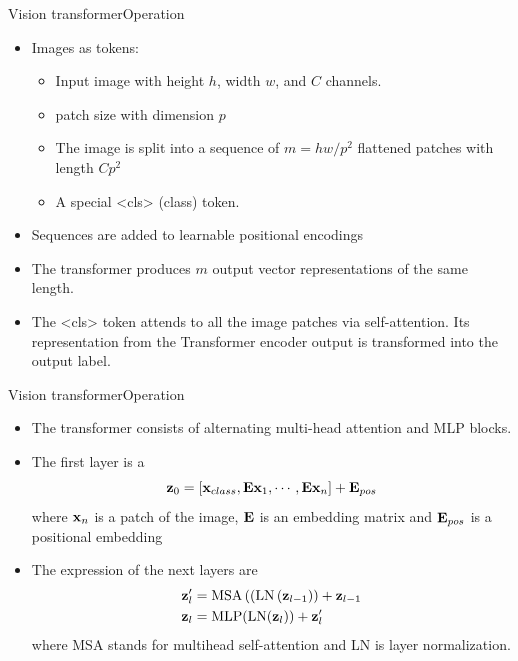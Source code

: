 \documentclass{beamer}
\begin{document}
\begin{frame}{Vision transformer}{Operation}

\begin{itemize}
\item Images as tokens:
\begin{itemize}
\item Input image with height $h$, width $w$, and $C$
 channels. 
 \item patch size with dimension $p$
\item The image is split into a sequence of $m=hw/p^2$
 flattened patches with length $Cp^2$
 \item  A special <cls> (class) token.
\end{itemize}

\item Sequences are added to learnable positional encodings
\item The transformer produces $m$  output vector representations of the same length. 

\item The <cls> token attends to all the image patches via self-attention. Its representation from the Transformer encoder output is transformed into the output label.
\end{itemize}   

\end{frame}
\begin{frame}{Vision transformer}{Operation}
\begin{itemize}
    \item The transformer consists of alternating multi-head attention and MLP blocks. 
    \item The first layer is a 
\begin{equation}
   {\bf z}_0 = \left[{\bf x}_{class},  {\bf E}{\bf x}_1, \cdots, {\bf E}{\bf x}_n  \right] + {\bf E}_{pos}
\end{equation}
where ${\bf x}_n$ is a patch of the image, ${\bf E}$ is an embedding matrix and ${\bf E}_{pos}$ is a positional embedding

\item The expression of the next layers are
\begin{equation}
\begin{split}
     {\bf z}'_{l}&=\text{MSA}\left((\text{LN}\left({\bf z}_{l-1}\right)\right)+{\bf z}_{l-1}\\
     {\bf z}_l&=\text{MLP}(\text{LN}({\bf z}_{l}))+{\bf z}'_{l}
\end{split}
\end{equation}
where MSA stands for multihead self-attention and LN is layer normalization. 
\end{itemize}
\end{frame}
\end{document}
